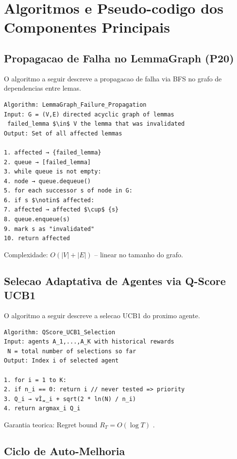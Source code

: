 \documentclass[5p]{elsarticle}
\begin{document}
\section{Algoritmos e Pseudo-codigo dos Componentes Principais}

\subsection{Propagacao de Falha no LemmaGraph (P20)}

O algoritmo a seguir descreve a propagacao de falha via BFS no grafo
de dependencias entre lemas.

\begin{Verbatim}[fontsize=\footnotesize,frame=single]
Algorithm: LemmaGraph_Failure_Propagation
Input: G = (V,E) directed acyclic graph of lemmas
 failed_lemma $\in$ V the lemma that was invalidated
Output: Set of all affected lemmas

1. affected → {failed_lemma}
2. queue → [failed_lemma]
3. while queue is not empty:
4. node → queue.dequeue()
5. for each successor s of node in G:
6. if s $\notin$ affected:
7. affected → affected $\cup$ {s}
8. queue.enqueue(s)
9. mark s as "invalidated"
10. return affected
\end{Verbatim}

Complexidade: $O(|V| + |E|)$ -- linear no tamanho do grafo.

\subsection{Selecao Adaptativa de Agentes via Q-Score UCB1}

O algoritmo a seguir descreve a selecao UCB1 do proximo agente.

\begin{Verbatim}[fontsize=\footnotesize,frame=single]
Algorithm: QScore_UCB1_Selection
Input: agents A_1,...,A_K with historical rewards
 N = total number of selections so far
Output: Index i of selected agent

1. for i = 1 to K:
2. if n_i == 0: return i // never tested => priority
3. Q_i → vÌ„_i + sqrt(2 * ln(N) / n_i)
4. return argmax_i Q_i
\end{Verbatim}

Garantia teorica: Regret bound $R_T = O(\log T)$ \cite{auer2002}.

\subsection{Ciclo de Auto-Melhoria}
\end{document}
